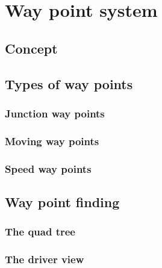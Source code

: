 

\section{Way point system}

\subsection{Concept}

\subsection{Types of way points}

\subsubsection{Junction way points}

\subsubsection{Moving way points}

\subsubsection{Speed way points}

\subsection{Way point finding}


\subsubsection{The quad tree}

\subsubsection{The driver view}
